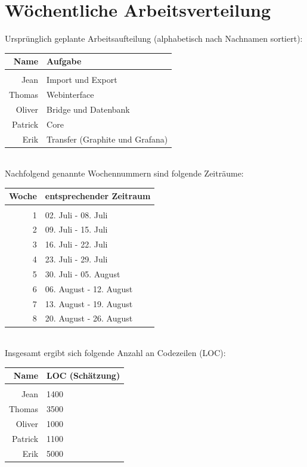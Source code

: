 \chapter{Wöchentliche Arbeitsverteilung}
Ursprünglich geplante Arbeitsaufteilung (alphabetisch nach Nachnamen sortiert):\\
\newline
\begin{tabular}{r|l}
	\textbf{Name} & \textbf{Aufgabe}\\
	\hline & \\[-1.0em]
	Jean & Import und Export\\[0.25em]
	Thomas & Webinterface\\[0.25em]
	Oliver & Bridge und Datenbank\\[0.25em]
	Patrick & Core\\[0.25em]
	Erik & Transfer (Graphite und Grafana)
\end{tabular}
\newline\\[0.5cm]
Nachfolgend genannte Wochennummern sind folgende Zeiträume:\\
\newline
\begin{tabular}{r|l}
	\textbf{Woche} & \textbf{entsprechender Zeitraum}\\
	\hline & \\[-1.0em]
	1 & 02. Juli - 08. Juli\\[0.25em]
	2 & 09. Juli - 15. Juli\\[0.25em]
	3 & 16. Juli - 22. Juli\\[0.25em]
	4 & 23. Juli - 29. Juli\\[0.25em]
	5 & 30. Juli - 05. August\\[0.25em]
	6 & 06. August - 12. August\\[0.25em]
	7 & 13. August - 19. August\\[0.25em]
	8 & 20. August - 26. August
\end{tabular}
\newline\\[0.5cm]
Insgesamt ergibt sich folgende Anzahl an Codezeilen (LOC):\\
\newline
\begin{tabular}{r|l}
	\textbf{Name} & \textbf{LOC (Schätzung)}\\
	\hline & \\[-1.0em]
	Jean & 1400\\[0.25em]
	Thomas & 3500\\[0.25em]
	Oliver & 1000\\[0.25em]
	Patrick & 1100\\[0.25em]
	Erik & 5000
\end{tabular}
